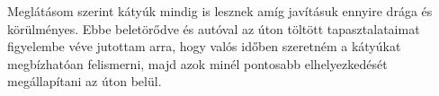 Meglátásom szerint kátyúk mindig is lesznek amíg javításuk ennyire drága
és körülményes. Ebbe beletörődve és autóval az úton töltött
tapasztalataimat figyelembe véve jutottam arra, hogy valós időben
szeretném a kátyúkat megbízhatóan felismerni, majd azok minél pontosabb
elhelyezkedését megállapítani az úton belül.